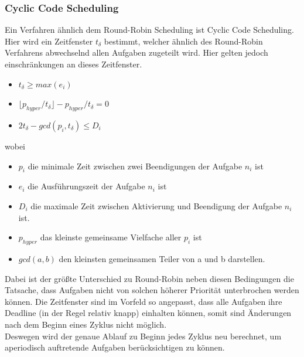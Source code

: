 \subsubsection{Cyclic Code Scheduling}
\label{2.7.3}
Ein Verfahren ähnlich dem Round-Robin Scheduling ist Cyclic Code Scheduling. Hier wird ein Zeitfenster $t_\delta$ bestimmt, welcher ähnlich des Round-Robin Verfahrens abwechselnd allen Aufgaben zugeteilt wird. Hier gelten jedoch einschränkungen an dieses Zeitfenster.
\begin{itemize}
\item $t_\delta \geq max (e_i)$
\item $\lfloor p_{hyper} / t_\delta\rfloor - p_{hyper} / t_\delta = 0$
\item $2 t_\delta - gcd(p_i, t_\delta) \leq D_i$
\end{itemize}
wobei
\begin{itemize}
\item $p_i$ die minimale Zeit zwischen zwei Beendigungen der Aufgabe $n_i$ ist
\item $e_i$ die Ausführungszeit der Aufgabe $n_i$ ist
\item $D_i$ die maximale Zeit zwischen Aktivierung und Beendigung der Aufgabe $n_i$ ist.
\item $p_{hyper}$ das kleinste gemeinsame Vielfache aller $p_i$ ist
\item $gcd(a,b)$ den kleinsten gemeinsamen Teiler von a und b darstellen.
\end{itemize}
Dabei ist der größte Unterschied zu Round-Robin neben diesen Bedingungen die Tatsache, dass Aufgaben nicht von solchen höherer Priorität unterbrochen werden können. Die Zeitfenster sind im Vorfeld so angepasst, dass alle Aufgaben ihre Deadline (in der Regel relativ knapp) einhalten können, somit sind Änderungen nach dem Beginn eines Zyklus nicht möglich.\\
Deswegen wird der genaue Ablauf zu Beginn jedes Zyklus neu berechnet, um aperiodisch auftretende Aufgaben berücksichtigen zu können.

